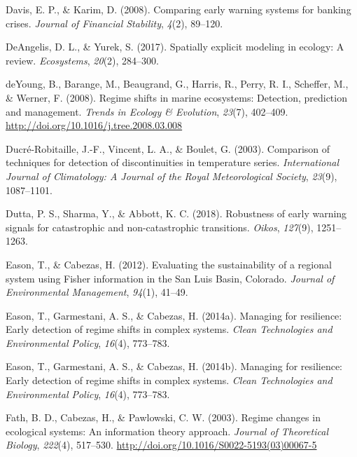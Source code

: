 \documentclass[12pt,twoside,openany]{reedthesis}
\begin{document}
\leavevmode\hypertarget{ref-davis_comparing_2008}{}%
Davis, E. P., \& Karim, D. (2008). Comparing early warning systems for banking crises. \emph{Journal of Financial Stability}, \emph{4}(2), 89--120.

\leavevmode\hypertarget{ref-deangelis2017spatially}{}%
DeAngelis, D. L., \& Yurek, S. (2017). Spatially explicit modeling in ecology: A review. \emph{Ecosystems}, \emph{20}(2), 284--300.

\leavevmode\hypertarget{ref-deyoung_regime_2008}{}%
deYoung, B., Barange, M., Beaugrand, G., Harris, R., Perry, R. I., Scheffer, M., \& Werner, F. (2008). Regime shifts in marine ecosystems: Detection, prediction and management. \emph{Trends in Ecology \& Evolution}, \emph{23}(7), 402--409. \url{http://doi.org/10.1016/j.tree.2008.03.008}

\leavevmode\hypertarget{ref-ducre2003comparison}{}%
Ducré-Robitaille, J.-F., Vincent, L. A., \& Boulet, G. (2003). Comparison of techniques for detection of discontinuities in temperature series. \emph{International Journal of Climatology: A Journal of the Royal Meteorological Society}, \emph{23}(9), 1087--1101.

\leavevmode\hypertarget{ref-dutta2018robustness}{}%
Dutta, P. S., Sharma, Y., \& Abbott, K. C. (2018). Robustness of early warning signals for catastrophic and non-catastrophic transitions. \emph{Oikos}, \emph{127}(9), 1251--1263.

\leavevmode\hypertarget{ref-eason_evaluating_2012}{}%
Eason, T., \& Cabezas, H. (2012). Evaluating the sustainability of a regional system using Fisher information in the San Luis Basin, Colorado. \emph{Journal of Environmental Management}, \emph{94}(1), 41--49.

\leavevmode\hypertarget{ref-eason_managing_2014}{}%
Eason, T., Garmestani, A. S., \& Cabezas, H. (2014a). Managing for resilience: Early detection of regime shifts in complex systems. \emph{Clean Technologies and Environmental Policy}, \emph{16}(4), 773--783.

\leavevmode\hypertarget{ref-eason2014managing}{}%
Eason, T., Garmestani, A. S., \& Cabezas, H. (2014b). Managing for resilience: Early detection of regime shifts in complex systems. \emph{Clean Technologies and Environmental Policy}, \emph{16}(4), 773--783.

\leavevmode\hypertarget{ref-fath_regime_2003}{}%
Fath, B. D., Cabezas, H., \& Pawlowski, C. W. (2003). Regime changes in ecological systems: An information theory approach. \emph{Journal of Theoretical Biology}, \emph{222}(4), 517--530. \url{http://doi.org/10.1016/S0022-5193(03)00067-5}
\end{document}
